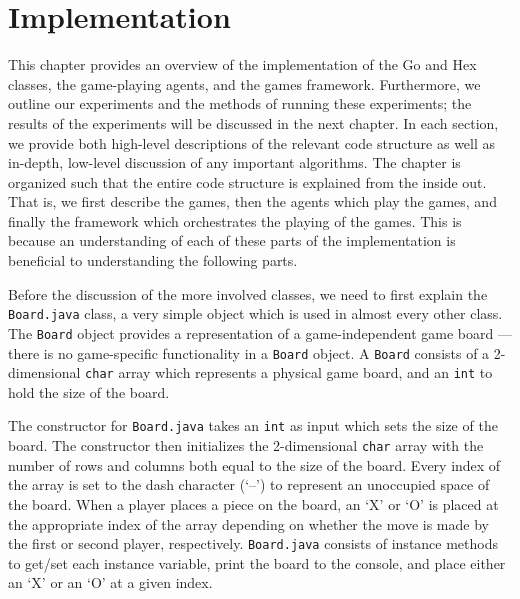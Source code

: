 %
%
%
\chapter{Implementation} \label{ch:method}
This chapter provides an overview of the implementation of the Go and Hex classes, the game-playing agents, and the games framework.  Furthermore, we outline our experiments and the methods of running these experiments; the results of the experiments will be discussed in the next chapter.  In each section, we provide both high-level descriptions of the relevant code structure as well as in-depth, low-level discussion of any important algorithms.  The chapter is organized such that the entire code structure is explained from the inside out.  That is, we first describe the games, then the agents which play the games, and finally the framework which orchestrates the playing of the games.  This is because an understanding of each of these parts of the implementation is beneficial to understanding the following parts.

Before the discussion of the more involved classes, we need to first explain the \texttt{Board.java} class, a very simple object which is used in almost every other class.  The \texttt{Board} object provides a representation of a game-independent game board --- there is no game-specific functionality in a \texttt{Board} object.  A \texttt{Board} consists of a 2-dimensional \texttt{char} array which represents a physical game board, and an \texttt{int} to hold the size of the board.  

The constructor for \texttt{Board.java} takes an \texttt{int} as input which sets the size of the board.  The constructor then initializes the 2-dimensional \texttt{char} array with the number of rows and columns both equal to the size of the board.  Every index of the array is set to the dash character (`--') to represent an unoccupied space of the board.  When a player places a piece on the board, an `X' or `O' is placed at the appropriate index of the array depending on whether the move is made by the first or second player, respectively.  \texttt{Board.java} consists of instance methods to get/set each instance variable, print the board to the console, and place either an `X' or an `O' at a given index.

